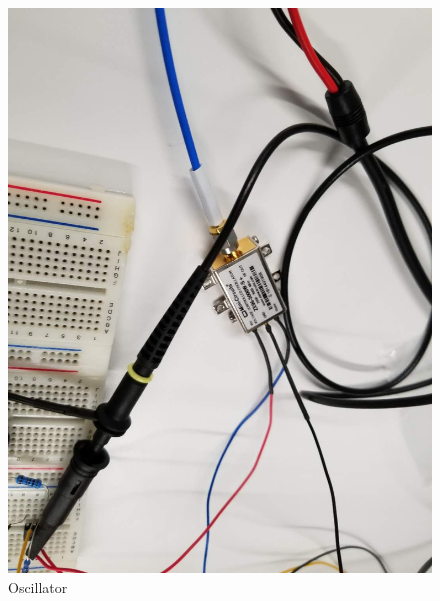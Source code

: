 \documentclass[12pt,a4paper]{report}
\begin{document}
\begin{figure}
    \centerline{\includegraphics[scale=0.2]{Oscillator.PNG}}
    \caption{Oscillator}
    \label{fig:Oscilaltor}
\end{figure}
\end{document}
